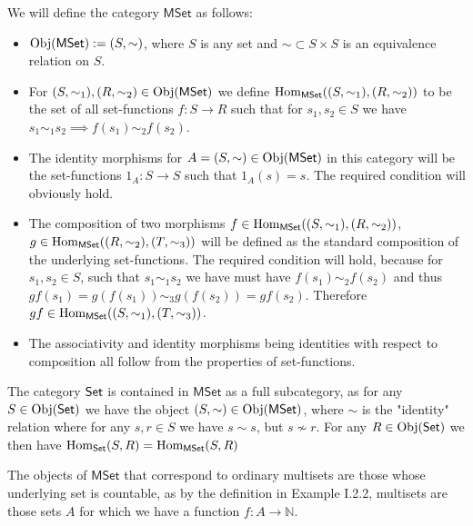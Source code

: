 \begin{problem}
\end{problem}

\begin{solution}
	We will define the category $\mathsf{MSet}$ as follows:
	\begin{itemize}
		\item $\mathrm{Obj}(\mathsf{MSet}) := (S, \sim)$, where $S$ is any set and $\sim \subset S \times S$ is an equivalence relation on $S$.
		\item For $(S, \sim_1), (R, \sim_2) \in \mathrm{Obj}(\mathsf{MSet})$ we define $\mathrm{Hom}_{\mathsf{MSet}}((S, \sim_1),(R, \sim_2))$ to be the set of all set-functions $f: S \to R$ such that for $s_1, s_2 \in S$ we have $s_1 \sim_1 s_2 \implies f(s_1) \sim_2 f(s_2)$.
		\item The identity morphisms for $A=(S, \sim) \in \mathrm{Obj}(\mathsf{MSet})$ in this category will be the set-functions $1_A: S \to S$ such that $1_A(s) = s$. The required condition will obviously hold.
		\item The composition of two morphisms $f \in \mathrm{Hom}_\mathsf{MSet}((S, \sim_1), (R, \sim_2))$, $g \in \mathrm{Hom}_\mathsf{MSet}((R, \sim_2),(T, \sim_3))$ will be defined as the standard composition of the underlying set-functions. The required condition will hold, because for $s_1, s_2 \in S$, such that $s_1 \sim_1 s_2$ we have must have $f(s_1) \sim_2 f(s_2)$ and thus $gf(s_1) = g(f(s_1)) \sim_3 g(f(s_2)) = gf(s_2)$. Therefore $gf \in \mathrm{Hom}_\mathsf{MSet}((S, \sim_1),(T, \sim_3))$.
		\item The associativity and identity morphisms being identities with respect to composition all follow from the properties of set-functions.
	\end{itemize}
	
	The category $\mathsf{Set}$ is contained in $\mathsf{MSet}$ as a full subcategory, as for any $S \in \mathrm{Obj}(\mathsf{Set})$ we have the object $(S, \sim) \in \mathrm{Obj}(\mathsf{MSet})$, where $\sim$ is the "identity" relation where for any $s,r \in S$ we have $s \sim s$, but $s \not \sim r$.  For any $R \in \mathrm{Obj}(\mathsf{Set})$ we then have $\mathrm{Hom}_{\mathsf{Set}}(S,R) = \mathrm{Hom}_\mathsf{MSet}(S,R)$
	
	The objects of $\mathsf{MSet}$ that correspond to ordinary multisets are those whose underlying set is countable, as by the definition in Example I.2.2, multisets are those sets $A$ for which we have a function $f: A \to \mathbb{N}$.
\end{solution}

\begin{problem}
\end{problem}

